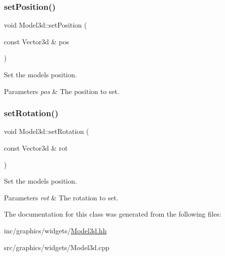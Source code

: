 \subsubsection{\texorpdfstring{set\+Position()}{setPosition()}}
{\footnotesize\ttfamily void Model3d\+::set\+Position (\begin{DoxyParamCaption}\item[{const Vector3d \&}]{pos }\end{DoxyParamCaption})}



Set the model\textquotesingle{}s position. 


\begin{DoxyParams}{Parameters}
{\em pos} & The position to set. \\
\hline
\end{DoxyParams}
\mbox{\label{classModel3d_adc3c185a679687b4bf483f89eb2c20a9}} 
\subsubsection{\texorpdfstring{set\+Rotation()}{setRotation()}}
{\footnotesize\ttfamily void Model3d\+::set\+Rotation (\begin{DoxyParamCaption}\item[{const Vector3d \&}]{rot }\end{DoxyParamCaption})}



Set the model\textquotesingle{}s position. 


\begin{DoxyParams}{Parameters}
{\em rot} & The rotation to set. \\
\hline
\end{DoxyParams}


The documentation for this class was generated from the following files\+:\begin{DoxyCompactItemize}
\item 
inc/graphics/widgets/\hyperlink{Model3d_8hh}{Model3d.\+hh}\item 
src/graphics/widgets/Model3d.\+cpp\end{DoxyCompactItemize}
